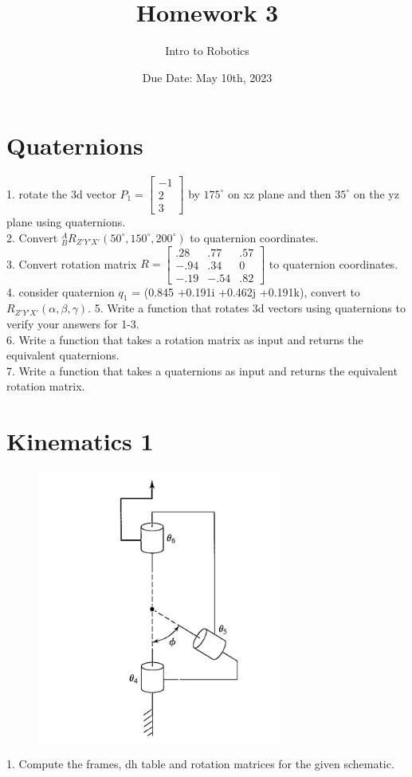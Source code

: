 \documentclass{article}
\title{Homework 3}
\author{Intro to Robotics}
\date{Due Date: May 10th, 2023}
\begin{document}
\maketitle
\section{Quaternions}
1. rotate the 3d vector $P_{1}=\begin{bmatrix}
-1  \\
2 \\
3
\end{bmatrix}$ by $175^{\circ}$ on xz plane and then $35^{\circ}$ on the yz plane using quaternions. \\
2. Convert ${}^{A}_{B}R_{Z'Y'X'}(50^\circ, 150^\circ, 200^\circ)$ to quaternion coordinates.\\
3. Convert rotation matrix $R=\begin{bmatrix}
.28 & .77 & .57\\
-.94 & .34 & 0 \\
-.19 & -.54 & .82
\end{bmatrix}$ to quaternion coordinates.\\
4. consider quaternion $q_{1}$ = (0.845 +0.191i +0.462j +0.191k), convert to $R_{Z'Y'X'}(\alpha,\beta,\gamma)$.
5.  Write a function that rotates 3d vectors using quaternions to verify your answers for 1-3.\\
6. Write a function that takes a rotation matrix as input and returns the equivalent quaternions.\\
7. Write a function that takes a quaternions as input and returns the equivalent rotation matrix.
\newpage
\section{Kinematics 1}
\begin{figure}[htp]
    \centering
    \includegraphics[width=8cm]{arm schematic1.png}
    \caption{}
    \label{fig:Arm}
\end{figure}
1. Compute the frames, dh table and rotation matrices for the given schematic.
\newpage
\end{document}
